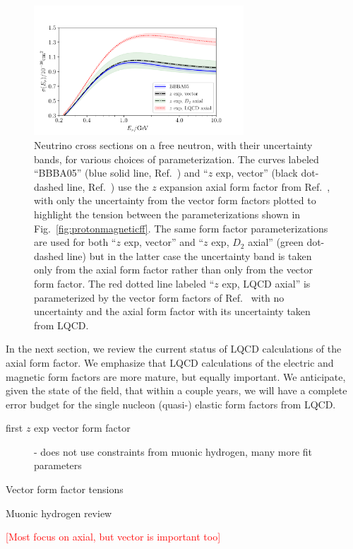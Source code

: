 \begin{figure}[hbt!]
 \centering
 \includegraphics[width=0.7\textwidth]{plots/xsec_comparison-standalone.pdf}
\caption{
 Neutrino cross sections on a free neutron, with their uncertainty bands,
 for various choices of parameterization.
 The curves labeled ``BBBA05'' (blue solid line, Ref.~\cite{Bradford:2006yz})
 and ``$z$ exp, vector'' (black dot-dashed line, Ref.~\cite{Borah:2020gte}) use the
 $z$ expansion axial form factor from Ref.~\cite{Meyer:2016oeg},
 with only the uncertainty from the vector form factors plotted
 to highlight the tension between the parameterizations shown in Fig.~\ref{fig:protonmagneticff}.
 The same form factor parameterizations are used for both ``$z$ exp, vector'' and
 ``$z$ exp, $D_{2}$ axial'' (green dot-dashed line)
 but in the latter case the uncertainty band is taken only from
 the axial form factor rather than only from the vector form factor.
 The red dotted line labeled ``$z$ exp, LQCD axial'' is parameterized by
 the vector form factors of Ref.~\cite{Borah:2020gte} with no uncertainty
 and the axial form factor with its uncertainty taken from LQCD.
 \label{fig:nucleonxsec}
}
\end{figure}

In the next section, we review the current status of LQCD calculations of the axial form factor.
We emphasize that LQCD calculations of the electric and magnetic form factors are more mature, but equally important.
We anticipate, given the state of the field, that within a couple years, we will have a complete error budget for the single nucleon (quasi-) elastic form factors from LQCD.






\bigskip{}
\begin{description}
\item[first $z$ exp vector form factor] \cite{Ye:2017gyb}
 - does not use constraints from muonic hydrogen, many more fit parameters
\item[Vector form factor tensions] \cite{Borah:2020gte}
\item[Muonic hydrogen review] \cite{Hill:2017wgb}
\end{description}

\textcolor{red}{[Most focus on axial, but vector is important too]}
